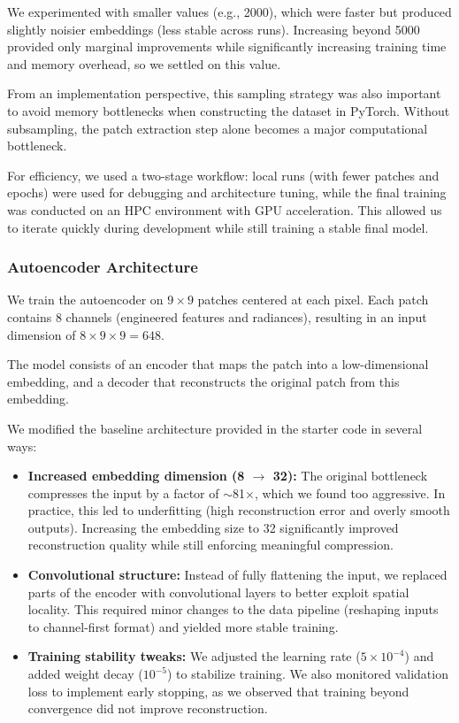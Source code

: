 \documentclass[10pt,letterpaper]{article}
\begin{document}
We experimented with smaller values (e.g., 2000), which were faster but produced slightly noisier embeddings (less stable across runs). Increasing beyond 5000 provided only marginal improvements while significantly increasing training time and memory overhead, so we settled on this value.

From an implementation perspective, this sampling strategy was also important to avoid memory bottlenecks when constructing the dataset in PyTorch. Without subsampling, the patch extraction step alone becomes a major computational bottleneck.

For efficiency, we used a two-stage workflow: local runs (with fewer patches and epochs) were used for debugging and architecture tuning, while the final training was conducted on an HPC environment with GPU acceleration. This allowed us to iterate quickly during development while still training a stable final model.

\subsubsection*{Autoencoder Architecture}

We train the autoencoder on $9 \times 9$ patches centered at each pixel. Each patch contains 8 channels (engineered features and radiances), resulting in an input dimension of $8 \times 9 \times 9 = 648$.

The model consists of an encoder that maps the patch into a low-dimensional embedding, and a decoder that reconstructs the original patch from this embedding.

We modified the baseline architecture provided in the starter code in several ways:

\begin{itemize}
    \item \textbf{Increased embedding dimension (8 $\rightarrow$ 32):}  
    The original bottleneck compresses the input by a factor of $\sim$81$\times$, which we found too aggressive. In practice, this led to underfitting (high reconstruction error and overly smooth outputs). Increasing the embedding size to 32 significantly improved reconstruction quality while still enforcing meaningful compression.

    \item \textbf{Convolutional structure:}  
    Instead of fully flattening the input, we replaced parts of the encoder with convolutional layers to better exploit spatial locality. This required minor changes to the data pipeline (reshaping inputs to channel-first format) and yielded more stable training.

    \item \textbf{Training stability tweaks:}  
    We adjusted the learning rate ($5 \times 10^{-4}$) and added weight decay ($10^{-5}$) to stabilize training. We also monitored validation loss to implement early stopping, as we observed that training beyond convergence did not improve reconstruction.
\end{itemize}
\end{document}
